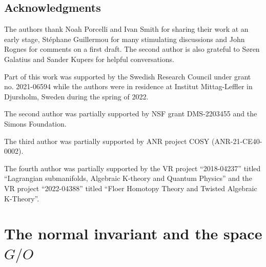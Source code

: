 \documentclass[reqno]{amsart}
\theoremstyle{theorem}
\theoremstyle{remark}
\theoremstyle{definition}
\begin{document}
\subsection{Acknowledgments}
The authors thank Noah Porcelli and Ivan Smith for sharing their work at an early stage, Stéphane Guillermou for many stimulating discussions
and John Rognes for comments on a first draft. The second author is also grateful to S\o ren Galatius and Sander Kupers for helpful conversations. 

Part of this work was supported by the Swedish Research Council under grant no. 2021-06594 while the authors were in residence at Institut Mittag-Leffler in Djursholm, Sweden during the spring of 2022.

The second author was partially supported by NSF grant DMS-2203455 and the Simons Foundation.

The third author was partially supported by ANR project COSY (ANR-21-CE40-0002).

The fourth author was partially supported by the VR project ``2018-04237'' titled ``Lagrangian submanifolds, Algebraic K-theory and Quantum Physics'' and the VR project ``2022-04388'' titled ``Floer Homotopy Theory and Twisted Algebraic K-Theory''.


\section{The normal invariant and the space $G/O$} \label{sec:norm-invar-models}
\end{document}

